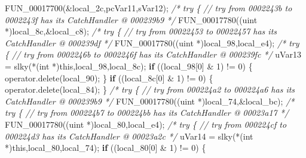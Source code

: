 \documentclass[
]{article}
\newenvironment{Shaded}{}{}
\newcommand{\CommentTok}[1]{\textcolor[rgb]{0.38,0.63,0.69}{\textit{#1}}}
\newcommand{\ControlFlowTok}[1]{\textcolor[rgb]{0.00,0.44,0.13}{\textbf{#1}}}
\newcommand{\DataTypeTok}[1]{\textcolor[rgb]{0.56,0.13,0.00}{#1}}
\newcommand{\DecValTok}[1]{\textcolor[rgb]{0.25,0.63,0.44}{#1}}
\newcommand{\NormalTok}[1]{#1}
\newcommand{\OperatorTok}[1]{\textcolor[rgb]{0.40,0.40,0.40}{#1}}
\begin{document}
\begin{Shaded}
\begin{Highlighting}[]
\NormalTok{      FUN\_00017700}\OperatorTok{(\&}\NormalTok{local\_2c}\OperatorTok{,}\NormalTok{pcVar11}\OperatorTok{,}\NormalTok{sVar12}\OperatorTok{);}
                    \CommentTok{/* try \{ // try from 0002243b to 0002243f has its CatchHandler @ 000239b9 */}
\NormalTok{      FUN\_00017780}\OperatorTok{((}\NormalTok{uint }\OperatorTok{*)}\NormalTok{local\_8c}\OperatorTok{,\&}\NormalTok{local\_c8}\OperatorTok{);}
                    \CommentTok{/* try \{ // try from 00022453 to 00022457 has its CatchHandler @ 000239df */}
\NormalTok{      FUN\_00017780}\OperatorTok{((}\NormalTok{uint }\OperatorTok{*)}\NormalTok{local\_98}\OperatorTok{,}\NormalTok{local\_e4}\OperatorTok{);}
                    \CommentTok{/* try \{ // try from 0002246b to 0002246f has its CatchHandler @ 000239fc */}
\NormalTok{      uVar13 }\OperatorTok{=}\NormalTok{ slky}\OperatorTok{(*(}\DataTypeTok{int} \OperatorTok{*)}\NormalTok{this}\OperatorTok{,}\NormalTok{local\_98}\OperatorTok{,}\NormalTok{local\_8c}\OperatorTok{);}
      \ControlFlowTok{if} \OperatorTok{((}\NormalTok{local\_98}\OperatorTok{[}\DecValTok{0}\OperatorTok{]} \OperatorTok{\&} \DecValTok{1}\OperatorTok{)} \OperatorTok{!=} \DecValTok{0}\OperatorTok{)} \OperatorTok{\{}
\NormalTok{        operator}\OperatorTok{.}\NormalTok{delete}\OperatorTok{(}\NormalTok{local\_90}\OperatorTok{);}
      \OperatorTok{\}}
      \ControlFlowTok{if} \OperatorTok{((}\NormalTok{local\_8c}\OperatorTok{[}\DecValTok{0}\OperatorTok{]} \OperatorTok{\&} \DecValTok{1}\OperatorTok{)} \OperatorTok{!=} \DecValTok{0}\OperatorTok{)} \OperatorTok{\{}
\NormalTok{        operator}\OperatorTok{.}\NormalTok{delete}\OperatorTok{(}\NormalTok{local\_84}\OperatorTok{);}
      \OperatorTok{\}}
                    \CommentTok{/* try \{ // try from 000224a2 to 000224a6 has its CatchHandler @ 000239b9 */}
\NormalTok{      FUN\_00017780}\OperatorTok{((}\NormalTok{uint }\OperatorTok{*)}\NormalTok{local\_74}\OperatorTok{,\&}\NormalTok{local\_bc}\OperatorTok{);}
                    \CommentTok{/* try \{ // try from 000224b7 to 000224bb has its CatchHandler @ 00023a17 */}
\NormalTok{      FUN\_00017780}\OperatorTok{((}\NormalTok{uint }\OperatorTok{*)}\NormalTok{local\_80}\OperatorTok{,}\NormalTok{local\_e4}\OperatorTok{);}
                    \CommentTok{/* try \{ // try from 000224cf to 000224d3 has its CatchHandler @ 00023a2c */}
\NormalTok{      uVar14 }\OperatorTok{=}\NormalTok{ slky}\OperatorTok{(*(}\DataTypeTok{int} \OperatorTok{*)}\NormalTok{this}\OperatorTok{,}\NormalTok{local\_80}\OperatorTok{,}\NormalTok{local\_74}\OperatorTok{);}
      \ControlFlowTok{if} \OperatorTok{((}\NormalTok{local\_80}\OperatorTok{[}\DecValTok{0}\OperatorTok{]} \OperatorTok{\&} \DecValTok{1}\OperatorTok{)} \OperatorTok{!=} \DecValTok{0}\OperatorTok{)} \OperatorTok{\{}

\end{Highlighting}
\end{Shaded}
\end{document}
